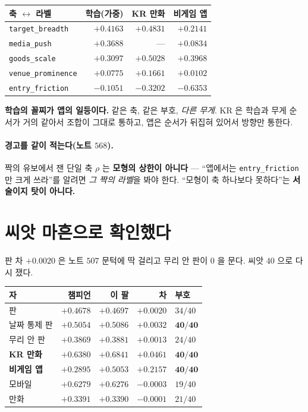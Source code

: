 \documentclass[11pt]{article}
\begin{document}
\begin{center}
\begin{tabular}{lrrr}
\hline
축 $\leftrightarrow$ 라벨 & 학습(가중) & KR 만화 & 비게임 앱 \\
\hline
\texttt{target\_breadth} & $\mathbf{+0.4163}$ & $+0.4831$ & $+0.2141$ \\
\texttt{media\_push} & $+0.3688$ & --- & $+0.0834$ \\
\texttt{goods\_scale} & $+0.3097$ & $\mathbf{+0.5028}$ & $+0.3968$ \\
\texttt{venue\_prominence} & $+0.0775$ & $+0.1661$ & $+0.0102$ \\
\texttt{entry\_friction} & $-0.1051$ & $-0.3202$ & $\mathbf{-0.6353}$ \\
\hline
\end{tabular}
\end{center}

\textbf{학습의 꼴찌가 앱의 일등이다.} 같은 축, 같은 부호, \emph{다른
무게}. KR 은 학습과 무게 순서가 거의 같아서 조합이 그대로 통하고, 앱은
순서가 뒤집혀 있어서 방향만 통한다.

\paragraph{경고를 같이 적는다(노트 $568$).}
짝의 유보에서 잰 단일 축 $\rho$ 는 \textbf{모형의 상한이 아니다} ---
``앱에서는 \texttt{entry\_friction} 만 크게 쓰라''를 알려면 \emph{그 짝의
라벨}을 봐야 한다. ``모형이 축 하나보다 못하다''는 \textbf{서술이지
탓이 아니다.}

\section{씨앗 마흔으로 확인했다}

판 차 $+0.0020$ 은 노트 $507$ 문턱에 딱 걸리고 무리 안 판이 $0$ 을 문다.
씨앗 $40$ 으로 다시 쟀다.

\begin{center}
\begin{tabular}{lrrrl}
\hline
자 & 챔피언 & 이 팔 & 차 & 부호 \\
\hline
판 & $+0.4678$ & $+0.4697$ & $+0.0020$ & $34/40$ \\
날짜 통제 판 & $+0.5054$ & $+0.5086$ & $+0.0032$ & $\mathbf{40/40}$ \\
무리 안 판 & $+0.3869$ & $+0.3881$ & $+0.0013$ & $24/40$ \\
\textbf{KR 만화} & $+0.6380$ & $\mathbf{+0.6841}$ & $\mathbf{+0.0461}$ & $\mathbf{40/40}$ \\
\textbf{비게임 앱} & $+0.2895$ & $\mathbf{+0.5053}$ & $\mathbf{+0.2157}$ & $\mathbf{40/40}$ \\
모바일 & $+0.6279$ & $+0.6276$ & $-0.0003$ & $19/40$ \\
만화 & $+0.3391$ & $+0.3390$ & $-0.0001$ & $21/40$ \\
\hline
\end{tabular}
\end{center}
\end{document}
